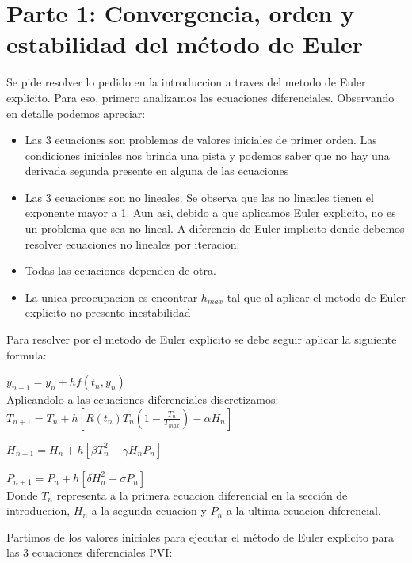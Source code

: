 \section{Parte 1: Convergencia, orden y estabilidad del método de Euler}

Se pide resolver lo pedido en la introduccion a traves del metodo de Euler explicito. Para eso, primero analizamos las ecuaciones diferenciales. Observando en detalle podemos apreciar:

\begin{itemize}
    \item Las 3 ecuaciones son problemas de valores iniciales de primer orden. Las condiciones iniciales nos brinda una pista y podemos saber que no hay una derivada segunda presente en alguna de las ecuaciones
    
    \item Las 3 ecuaciones son no lineales. Se observa que las no lineales tienen el exponente mayor a 1. Aun asi, debido a que aplicamos Euler explicito, no es un problema que sea no lineal. A diferencia de Euler implicito donde debemos resolver ecuaciones no lineales por iteracion.
    
    \item Todas las ecuaciones dependen de otra.

    \item La unica preocupacion es encontrar $h_{max}$ tal que al aplicar el metodo de Euler explicito no presente inestabilidad
\end{itemize}

Para resolver por el metodo de Euler explicito se debe seguir aplicar la siguiente formula:

$y_{n+1} = y_{n} + hf(t_{n}, y_{n})$ \\

Aplicandolo a las ecuaciones diferenciales discretizamos: \\


$T_{n+1} = T_{n} + h[R(t_{n})T_{n}(1- \frac{T_{n}}{T_{max}}) - \alpha H_{n}]$

$H_{n+1} = H_{n} + h[\beta T_{n}^{2} - \gamma H_{n}P_{n}]$

$P_{n+1} = P_{n} + h[\delta H_{n}^{2} - \sigma P_{n}]$ \\

Donde $T_{n}$ representa a la primera ecuacion diferencial en la sección de introduccion, $H_{n}$ a la segunda ecuacion y $P_{n}$ a la ultima ecuacion diferencial.

Partimos de los valores iniciales para ejecutar el método de Euler explicito para las 3 ecuaciones diferenciales PVI:

